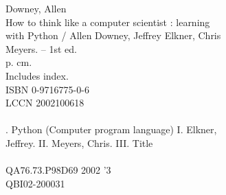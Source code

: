 \documentclass[10pt]{book}
\newcommand{\clearemptydoublepage}{\newpage{\pagestyle{empty}\cleardoublepage}}
\renewcommand{\clearemptydoublepage}{\cleardoublepage}
\newcommand{\blankpage}{\pagestyle{empty}\vspace*{1in}\newpage}
\renewcommand{\blankpage}{\vspace*{1in}\newpage}
\begin{document}
{\begin{tabbing}
Downey, Allen\\
\qquad  How to think like a computer scientist : learning \\
\quad  with Python / Allen Downey, Jeffrey Elkner, Chris       \\
\quad  Meyers. -- 1st ed. \\
\qquad  p. cm.            \\
\qquad Includes index.    \\
\qquad ISBN 0-9716775-0-6 \\
\qquad LCCN 2002100618    \\
\\
. Python (Computer program language)  I. Elkner, \\
\quad  Jeffrey.  II. Meyers, Chris.  III. Title           \\
\\
\quad QA76.73.P98D69 2002 \qquad \qquad {}'3          \\
\qquad \qquad \qquad \qquad \qquad \qquad \qquad QBI02-200031    \\
\end{tabbing}

} %



\clearemptydoublepage


\clearemptydoublepage


\clearemptydoublepage

\makeatletter
\renewcommand{\l@section}{\@dottedtocline{1}{1.5em}{3.0em}}
\makeatother
\setcounter{tocdepth}{1}

\tableofcontents
\clearemptydoublepage

\mainmatter

\clearemptydoublepage

\clearemptydoublepage

\clearemptydoublepage

\clearemptydoublepage

\clearemptydoublepage

\clearemptydoublepage

\clearemptydoublepage

\clearemptydoublepage

\clearemptydoublepage

\clearemptydoublepage

\clearemptydoublepage

\clearemptydoublepage

\clearemptydoublepage

\clearemptydoublepage

\clearemptydoublepage

\clearemptydoublepage

\clearemptydoublepage

\clearemptydoublepage

\clearemptydoublepage

\clearemptydoublepage

\appendix

\clearemptydoublepage

\clearemptydoublepage
%

\clearemptydoublepage

%

\printindex

\thispagestyle{empty} \blankpage
\thispagestyle{empty} \blankpage
\end{document}
